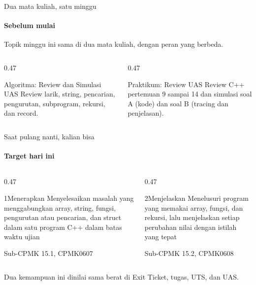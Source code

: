 \documentclass[t]{beamer}
\begin{document}

\begin{frame}{Dua mata kuliah, satu minggu}
\framesubtitle{Sebelum mulai}
Topik minggu ini sama di dua mata kuliah, dengan peran yang berbeda.
\vspace{10pt}

\begin{columns}[T]
\begin{column}{0.47\textwidth}
\begin{Blok}{Algoritma: Review dan Simulasi UAS}
Review larik, string, pencarian, pengurutan, subprogram, rekursi, dan record.
\end{Blok}
\end{column}
\begin{column}{0.47\textwidth}
\begin{BlokGelap}{Praktikum: Review UAS}
Review C++ pertemuan 9 sampai 14 dan simulasi soal A (kode) dan soal B (tracing dan penjelasan).
\end{BlokGelap}
\end{column}
\end{columns}
\end{frame}

\begin{frame}{Saat pulang nanti, kalian bisa}
\framesubtitle{Target hari ini}
\begin{columns}[T]
\begin{column}{0.47\textwidth}
\begin{Langkah}{1}{Menerapkan}
Menyelesaikan masalah yang menggabungkan array, string, fungsi, pengurutan atau pencarian, dan struct dalam satu program C++ dalam batas waktu ujian

{\footnotesize\color{ITERAInkMuted}Sub-CPMK 15.1, CPMK0607}
\end{Langkah}
\end{column}
\begin{column}{0.47\textwidth}
\begin{Langkah}{2}{Menjelaskan}
Menelusuri program yang memakai array, fungsi, dan rekursi, lalu menjelaskan setiap perubahan nilai dengan istilah yang tepat

{\footnotesize\color{ITERAInkMuted}Sub-CPMK 15.2, CPMK0608}
\end{Langkah}
\end{column}
\end{columns}
\vspace{8pt}
\begin{Catatan}
Dua kemampuan ini dinilai sama berat di Exit Ticket, tugas, UTS, dan UAS.
\end{Catatan}
\end{frame}
\end{document}
